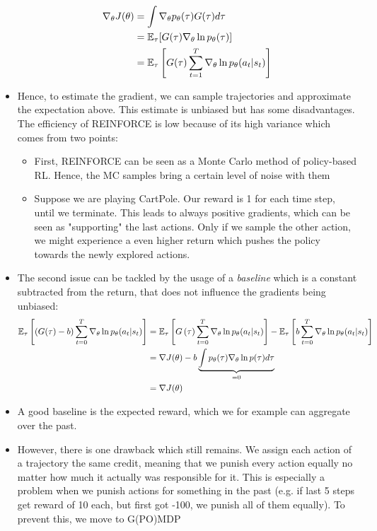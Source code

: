 \begin{itemize}
	\begin{equation*}
		\begin{split}
			\nabla_{\theta}J(\theta) & = \int \nabla_{\theta} p_{\theta}(\tau) G(\tau)d\tau\\
			& = \mathbb{E}_{\tau}[G(\tau)\nabla_{\theta} \ln p_{\theta}(\tau)]\\
			& = \mathbb{E}_{\tau}\left[G(\tau)\sum_{t=1}^{T}\nabla_{\theta} \ln p_{\theta}(a_t|s_t)\right]\\
		\end{split}
	\end{equation*}
	\item Hence, to estimate the gradient, we can sample trajectories and approximate the expectation above. This estimate is unbiased but has some disadvantages. The efficiency of REINFORCE is low because of its high variance which comes from two points:
	\begin{itemize}
		\item First, REINFORCE can be seen as a Monte Carlo method of policy-based RL. Hence, the MC samples bring a certain level of noise with them
		\item Suppose we are playing CartPole. Our reward is 1 for each time step, until we terminate. This leads to always positive gradients, which can be seen as "supporting" the last actions. Only if we sample the other action, we might experience a even higher return which pushes the policy towards the newly explored actions. 
	\end{itemize}
	\item The second issue can be tackled by the usage of a \textit{baseline} which is a constant subtracted from the return, that does not influence the gradients being unbiased:
	\begin{equation*}
		\begin{split}
			\mathbb{E}_{\tau}\left[\left(G(\tau)-b\right)\sum_{t=0}^{T}\nabla_{\theta} \ln p_{\theta}(a_t|s_t)\right] & = \mathbb{E}_{\tau}\left[G\left(\tau\right)\sum_{t=0}^{T}\nabla_{\theta} \ln p_{\theta}(a_t|s_t)\right]  - \mathbb{E}_{\tau}\left[b\sum_{t=0}^{T}\nabla_{\theta} \ln p_{\theta}(a_t|s_t)\right] \\
			& = \nabla J(\theta) - b\underbrace{\int p_{\theta}(\tau)\nabla_{\theta} \ln p(\tau)d\tau}_{=0}\\
			& = \nabla J(\theta) 
		\end{split}
	\end{equation*}
	\item A good baseline is the expected reward, which we for example can aggregate over the past.
	\item However, there is one drawback which still remains. We assign each action of a trajectory the same credit, meaning that we punish every action equally no matter how much it actually was responsible for it. This is especially a problem when we punish actions for something in the past (e.g. if last 5 steps get reward of 10 each, but first got -100, we punish all of them equally). To prevent this, we move to G(PO)MDP
\end{itemize}
